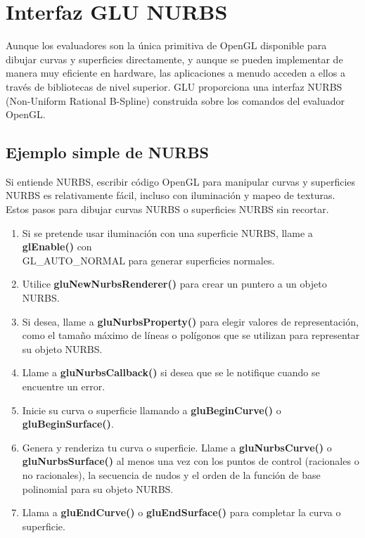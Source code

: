 \section{Interfaz GLU NURBS}

Aunque los evaluadores son la única primitiva de OpenGL
disponible para dibujar curvas y superficies directamente,
y aunque se pueden implementar de manera muy eficiente en hardware,
las aplicaciones a menudo acceden a ellos a través
de bibliotecas de nivel superior.
GLU proporciona una interfaz NURBS (Non-Uniform Rational B-Spline)
construida sobre los comandos del evaluador OpenGL.

\subsection{Ejemplo simple de NURBS}

Si entiende NURBS, escribir código OpenGL para
manipular curvas y superficies NURBS es relativamente
fácil, incluso con iluminación y mapeo de texturas.
Estos pasos para dibujar curvas NURBS o superficies NURBS sin recortar.

\begin{enumerate}
    \item Si se pretende usar iluminación con una superficie NURBS, llame
    a \textbf{glEnable()} con \\ GL\_AUTO\_NORMAL para generar superficies normales.
    \item Utilice \textbf{gluNewNurbsRenderer()} para crear un puntero
    a un objeto NURBS.
    \item Si desea, llame a \textbf{gluNurbsProperty()} para elegir
    valores de representación, como el tamaño máximo de líneas o polígonos
    que se utilizan para representar su objeto NURBS.
    \item Llame a \textbf{gluNurbsCallback()} si desea que se le notifique
    cuando se encuentre un error.
    \item Inicie su curva o superficie llamando a \textbf{gluBeginCurve()}
    o \textbf{gluBeginSurface()}.
    \item Genera y renderiza tu curva o superficie. Llame a
    \textbf{gluNurbsCurve()} o \textbf{gluNurbsSurface()} al menos una
    vez con los puntos de control (racionales o no racionales),
    la secuencia de nudos y el orden de la función de base polinomial
    para su objeto NURBS.
    \item Llama a \textbf{gluEndCurve()} o \textbf{gluEndSurface()}
    para completar la curva o superficie.
\end{enumerate}

